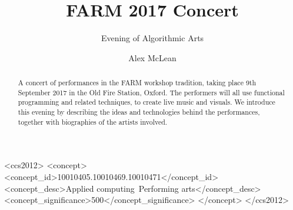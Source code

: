 \documentclass[sigplan,10pt,review]{acmart}\settopmatter{printfolios=true}
\begin{document}
\title[FARM 2017 Concert]{FARM 2017 Concert}         %
\subtitle{Evening of Algorithmic Arts}  %



\author{Alex McLean}

\begin{abstract}
A concert of performances in the FARM workshop tradition, taking place
9th September 2017 in the Old Fire Station, Oxford. The performers
will all use functional programming and related techniques, to create
live music and visuals. We introduce this evening by describing the
ideas and technologies behind the performances, together with
biographies of the artists involved.
\end{abstract}


\begin{CCSXML}
<ccs2012>
<concept>
<concept_id>10010405.10010469.10010471</concept_id>
<concept_desc>Applied computing~Performing arts</concept_desc>
<concept_significance>500</concept_significance>
</concept>
</ccs2012>
\end{CCSXML}
\end{document}
